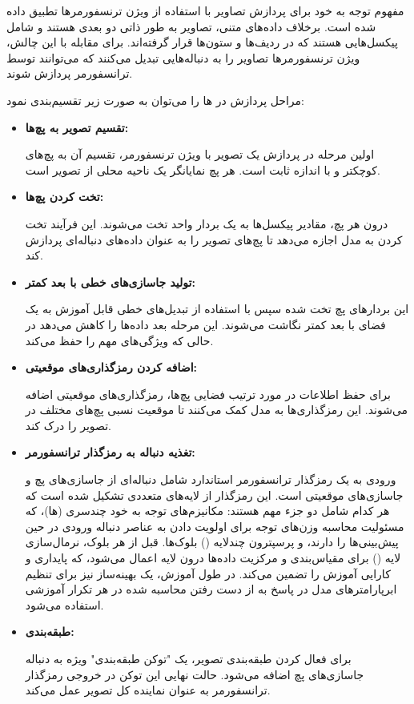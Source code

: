 
مفهوم توجه به خود برای پردازش تصاویر با استفاده از ویژن ترنسفورمرها تطبیق داده شده است. برخلاف داده‌های متنی، تصاویر به طور ذاتی دو بعدی هستند و شامل پیکسل‌هایی هستند که در ردیف‌ها و ستون‌ها قرار گرفته‌اند. برای مقابله با این چالش، ویژن ترنسفورمرها تصاویر را به دنباله‌هایی تبدیل می‌کنند که می‌توانند توسط ترانسفورمر پردازش شوند.

مراحل پردازش در  ها را می‌توان به صورت زیر تقسیم‌بندی نمود:

\begin{itemize}
	\item \textbf{تقسیم تصویر به پچ‌ها:}
	
	 اولین مرحله در پردازش یک تصویر با ویژن ترنسفورمر، تقسیم آن به پچ‌های کوچکتر و با اندازه ثابت است. هر پچ نمایانگر یک ناحیه محلی از تصویر است.
	
	\item \textbf{تخت کردن پچ‌ها:} 
	
	درون هر پچ، مقادیر پیکسل‌ها به یک بردار واحد تخت می‌شوند. این فرآیند تخت کردن به مدل اجازه می‌دهد تا پچ‌های تصویر را به عنوان داده‌های دنباله‌ای پردازش کند.
	
	\item \textbf{تولید جاسازی‌های خطی با بعد کمتر:}
	
	 این بردارهای پچ تخت شده سپس با استفاده از تبدیل‌های خطی قابل آموزش به یک فضای با بعد کمتر نگاشت می‌شوند. این مرحله بعد داده‌ها را کاهش می‌دهد در حالی که ویژگی‌های مهم را حفظ می‌کند.
	
	\item \textbf{اضافه کردن رمزگذاری‌های موقعیتی:}
	
	 برای حفظ اطلاعات در مورد ترتیب فضایی پچ‌ها، رمزگذاری‌های موقعیتی اضافه می‌شوند. این رمزگذاری‌ها به مدل کمک می‌کنند تا موقعیت نسبی پچ‌های مختلف در تصویر را درک کند.
	
	\item \textbf{تغذیه دنباله به رمزگذار ترانسفورمر:}
	
	 ورودی به یک رمزگذار ترانسفورمر استاندارد شامل دنباله‌ای از جاسازی‌های پچ و جاسازی‌های موقعیتی است. این رمزگذار از لایه‌های متعددی تشکیل شده است که هر کدام شامل دو جزء مهم هستند: مکانیزم‌های توجه به خود چندسری (ها)، که مسئولیت محاسبه وزن‌های توجه برای اولویت دادن به عناصر دنباله ورودی در حین پیش‌بینی‌ها را دارند، و پرسپترون چندلایه () بلوک‌ها. قبل از هر بلوک، نرمال‌سازی لایه () برای مقیاس‌بندی و مرکزیت داده‌ها درون لایه اعمال می‌شود، که پایداری و کارایی آموزش را تضمین می‌کند. در طول آموزش، یک بهینه‌ساز نیز برای تنظیم ابرپارامترهای مدل در پاسخ به از دست رفتن محاسبه شده در هر تکرار آموزشی استفاده می‌شود.
	
	\item \textbf{طبقه‌بندی:}
	
	 برای فعال کردن طبقه‌بندی تصویر، یک "توکن طبقه‌بندی" ویژه به دنباله جاسازی‌های پچ اضافه می‌شود. حالت نهایی این توکن در خروجی رمزگذار ترانسفورمر به عنوان نماینده کل تصویر عمل می‌کند.
\end{itemize}



